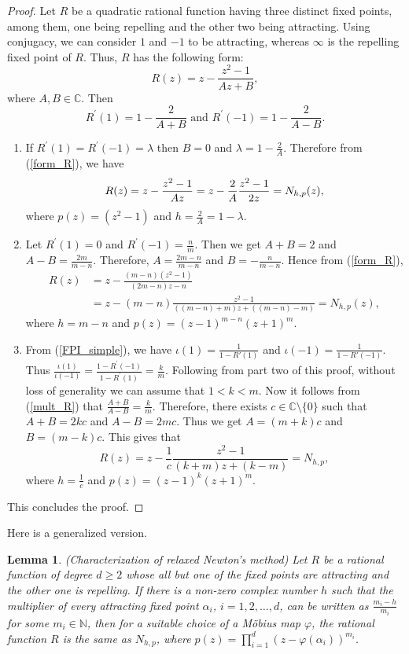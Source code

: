 \documentclass[12pt]{article}
\newtheorem{lem}{Lemma}[section]
\numberwithin{equation}{section}
\begin{document}
\begin{proof}
Let $R$ be a quadratic rational function having three distinct fixed points, among them, one being repelling and the other two being attracting. Using conjugacy, we can consider $ 1 $ and $ -1 $ to be attracting, whereas $\infty$ is the repelling fixed point of $R$. Thus, $R$ has the following form:
\begin{equation}\label{form_R}
R(z)=z-\frac{z^{2}-1}{A z+B},
\end{equation}
where $A, B \in \mathbb{C}$. Then
\begin{equation}\label{mult_R}
R^{\prime}(1)=1-\frac{2}{A+B} \text { and } R^{\prime}(-1)=1-\frac{2}{A-B}.
\end{equation}
\begin{enumerate}
	\item If $R^{\prime}(1)=R^{\prime}(-1)=\lambda$ then $B=0$ and $\lambda=1-\frac{2}{A}$.
Therefore from (\ref{form_R}), we have
$$R(z) =z-\frac{z^{2}-1}{A z}=z-\frac{2}{A} \frac{z^{2}-1}{2 z} \\
=N_{h, p}(z),$$
where $p(z)=\left(z^{2}-1\right)$ and $h=\frac{2}{A}=1-\lambda$.
\item  Let $R^{\prime}(1)=0$
and $R^{\prime}(-1)=\frac{n}{m}$. Then we get $A+B=2$ and $A-B=\frac{2 m}{m-n}$.
Therefore, $A=\frac{2 m-n}{m-n}$ and $B=-\frac{n}{m-n}$.
Hence from (\ref{form_R}),
$$
\begin{aligned}
R(z) & =z-\frac{(m-n)\left(z^{2}-1\right)}{(2 m-n) z-n} \\
& =z-(m-n) \frac{z^{2}-1}{((m-n)+m) z+((m-n)-m)} =N_{h, p}(z),
\end{aligned}
$$
where $h=m-n$ and $p(z)=(z-1)^{m-n}(z+1)^{m}$.
\item  From (\ref{FPI_simple}), we have $\iota(1)=\frac{1}{1-R'(1)}$ and $\iota(-1)=\frac{1}{1-R'(-1)}$. Thus $\frac{\iota(1)}{\iota(-1)}=\frac{1-R^{\prime}(-1)}{1-R^{\prime}(1)}=\frac{k}{m}$. Following from part two of this proof, without loss of generality we can assume that $1<k<m$. Now it follows from (\ref{mult_R}) that
$\frac{A+B}{A-B}=\frac{k}{m}.$
Therefore, there exists $c \in \mathbb{C} \setminus \{0\}$ such that $A+B=2 k c$ and $A-B=2 m c$. Thus we get $A=(m+k) c$ and $B=(m-k) c$. This gives that $$R(z)=z-\frac{1}{c} \frac{z^{2}-1}{(k+m) z+(k-m)}=N_{h, p},$$
 where $h=\frac{1}{c}$ and $p(z)=(z-1)^{k}(z+1)^{m}$.
\end{enumerate}
This concludes the proof.
\end{proof}
Here is a generalized version.
\begin{lem}(Characterization of relaxed Newton's method)
Let $R$ be a rational function of degree $d\geq 2$ whose all but one of the fixed points are attracting and the other one is repelling. If there is a non-zero complex number $h$ such that the multiplier of every attracting fixed point $\alpha_i$, $i=1,2,\dots, d$, can be written as $\frac{m_i-h}{m_i}$ for some $m_i\in \mathbb{N}$, then for a suitable choice of a M\"{o}bius map $\varphi$, the rational function $R$ is the same as $N_{h,p}$, where $p(z)=\prod_{i=1}^{d}(z-\varphi(\alpha_i))^{m_i}$.
\end{lem}
\end{document}
